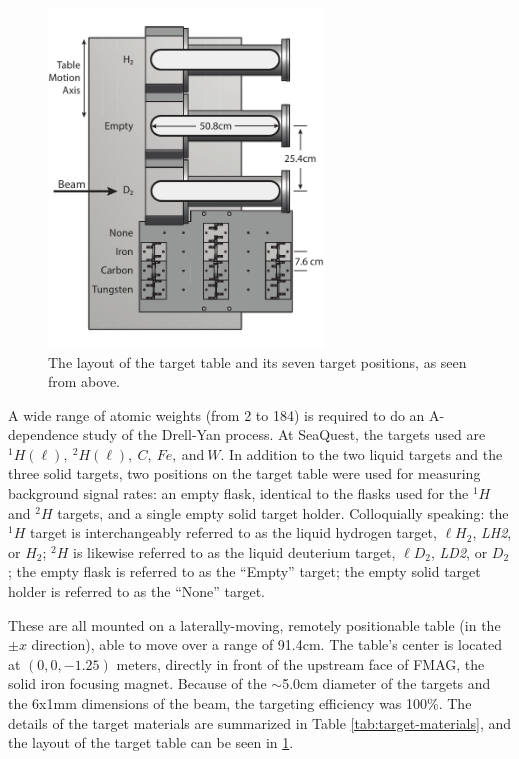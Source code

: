 \begin{figure}[p]
	\begin{center}
		\includegraphics[width=0.65\textwidth]{figures/apparatus/target-tableLayout.pdf}
		\caption{The layout of the target table and its seven target positions, as seen from above.}
		\label{fig:table-layout}
	\end{center}
\end{figure}


A wide range of atomic weights (from 2 to 184) is required to do an A-dependence study of the Drell-Yan process. At SeaQuest, the targets used are $^1H (\ell),\ ^2H (\ell),\ C,\ Fe,\ $and$\ W$. In addition to the two liquid targets and the three solid targets, two positions on the target table were used for measuring background signal rates: an empty flask, identical to the flasks used for the $^1H$ and $^2H$ targets, and a single empty solid target holder. Colloquially speaking: the $^1H$ target is interchangeably referred to as the liquid hydrogen target, $\ell H_2$, \emph{LH2}, or $H_2$; $^2H$ is likewise referred to as the liquid deuterium target, $\ell D_2$, \emph{LD2}, or $D_2$; the empty flask is referred to as the ``Empty'' target; the empty solid target holder is referred to as the ``None'' target.

These are all mounted on a laterally-moving, remotely positionable table (in the $\pm x$ direction), able to move over a range of 91.4cm. The table's center is located at $(0, 0, -1.25)$ meters, directly in front of the upstream face of FMAG, the solid iron focusing magnet. Because of the $\sim$5.0cm diameter of the targets and the 6x1mm dimensions of the beam, the targeting efficiency was 100\%. The details of the target materials are summarized in Table \ref{tab:target-materials}, and the layout of the target table can be seen in \ref{fig:table-layout}.

